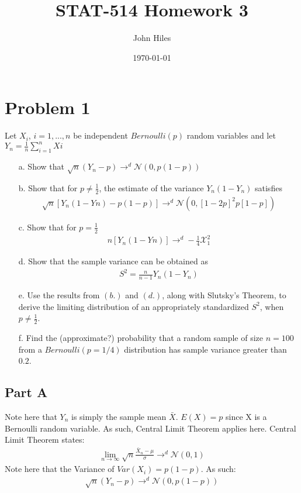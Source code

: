 \documentclass{article}
\title{STAT-514 Homework 3}
\author{John Hiles}
\date\today
\begin{document}
\maketitle %

\section*{Problem 1}
Let $X_i$, $i = 1,...,n$ be independent $Bernoulli(p)$ random variables and let $Y_n = \frac{1}{n}\sum_{i=1}^{n} Xi$
\begin{enumerate}
\item[a.] Show that $\sqrt{n}(Y_n-p)\rightarrow^d\mathcal{N}(0,p(1 - p))$
\item[b.] Show that for $p \neq \frac{1}{2}$, the estimate of the variance $Y_n(1-Y_n)$ satisfies
\begin{align*}
\sqrt{n}[Y_n(1 - Yn) - p(1 - p)] \rightarrow^d \mathcal{N}(0,[1 - 2p]^2 p[1 - p])
\end{align*}
\item[c.] Show that for $p=\frac{1}{2}$
\begin{align*}
n[Y_n(1 - Yn)] \rightarrow^d -\frac{1}{4}\mathcal{X}^2_1
\end{align*}
\item[d.] Show that the sample variance can be obtained as
\begin{align*}
S^2 = \frac{n}{n-1} Y_n(1-Y_n)
\end{align*}
\item[e.] Use the results from $(b.)$ and $(d.)$, along with Slutsky’s Theorem, to derive the limiting distribution of an appropriately standardized $S^2$, when $p \neq \frac{1}{2}$.
\item[f.] Find the (approximate?) probability that a random sample of size $n = 100$ from a $Bernoulli(p = 1/4)$ distribution has sample variance greater than $0.2$.
\end{enumerate}
\subsection*{Part A}
Note here that $Y_n$ is simply the sample mean $\bar{X}$. $E(X)=p$ since X is a Bernoulli random variable. As such, Central Limit Theorem applies here. Central Limit Theorem states:
\begin{align*}
\lim_{n\rightarrow \infty} \sqrt{n}\frac{\bar{X}_n-\mu}{\sigma} \rightarrow^d \mathcal{N}(0,1)
\end{align*}
Note here that the Variance of $Var(X_i)=p(1-p)$. As such:
\begin{align*}
\boxed{ \sqrt{n}(Y_n-p) \rightarrow^d \mathcal{N}(0,p(1 - p)) }
\end{align*}
\end{document}
